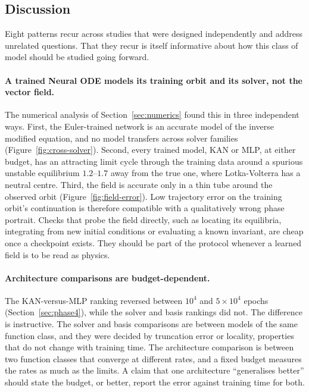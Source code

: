 \subsection{Discussion}
\label{sec:discussion}

Eight patterns recur across studies that were designed independently and
address unrelated questions. That they recur is itself informative about how
this class of model should be studied going forward.

\paragraph{A trained Neural ODE models its training orbit and its solver, not
the vector field.} The numerical analysis of Section~\ref{sec:numerics}
found this in three independent ways. First, the Euler-trained network is an
accurate model of the inverse modified equation, and no model transfers
across solver families (Figure~\ref{fig:cross-solver}). Second, every trained
model, KAN or MLP, at either budget, has an attracting limit cycle through
the training data around a spurious unstable equilibrium $1.2$--$1.7$ away
from the true one, where Lotka-Volterra has a neutral centre. Third, the
field is accurate only in a thin tube around the observed orbit
(Figure~\ref{fig:field-error}). Low trajectory error on the training orbit's
continuation is therefore compatible with a qualitatively wrong phase
portrait. Checks that probe the field directly, such as locating its
equilibria, integrating from new initial conditions or evaluating a known
invariant, are cheap once a checkpoint exists. They should be part of the
protocol whenever a learned field is to be read as physics.

\paragraph{Architecture comparisons are budget-dependent.} The
KAN-versus-MLP ranking reversed between $10^4$ and $5\times10^4$ epochs
(Section~\ref{sec:phase4}), while the solver and basis rankings did not. The
difference is instructive. The solver and basis comparisons are between
models of the same function class, and they were decided by truncation error
or locality, properties that do not change with training time. The
architecture comparison is between two function classes that converge at
different rates, and a fixed budget measures the rates as much as the
limits. A claim that one architecture ``generalises better'' should state
the budget, or better, report the error against training time for both.

